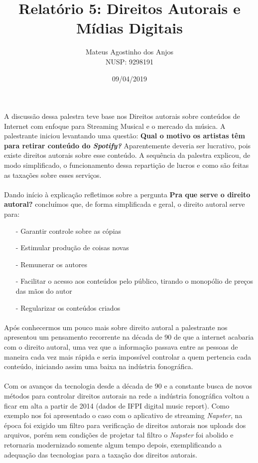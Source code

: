 \documentclass[10pt]{article}
\title{Relatório 5: Direitos Autorais e Mídias Digitais}
\author{Mateus Agostinho dos Anjos\\NUSP: 9298191}
\date{09/04/2019}
\begin{document}
	\maketitle
	\paragraph{}
		A discussão dessa palestra teve base nos Direitos autorais sobre conteúdos 
		de Internet com enfoque para Streaming Musical e o mercado da música.
		A palestrante iniciou levantando uma questão: \textbf{Qual o motivo os artistas 
		têm para retirar conteúdo do \textit{Spotify?}} Aparentemente deveria ser 
		lucrativo, pois existe direitos autorais sobre esse conteúdo. A sequência da 
		palestra explicou, de modo simplificado, o funcionamento dessa repartição de 
		lucros e como são feitas as taxações sobre esses serviços.
	\paragraph{}
		Dando início à explicação refletimos sobre a pergunta \textbf{Pra que serve
		o direito autoral?} concluímos que, de forma simplificada e geral, o direito
		autoral serve para:
		\begin{center}				
			\begin{itemize}
				\item[ - ]
					Garantir controle sobre as cópias
				\item[ - ]
					Estimular produção de coisas novas
				\item[ - ]
					Remunerar os autores
				\item[ - ]
					Facilitar o acesso aos conteúdos pelo público, tirando o monopólio
					de preços das mãos do autor
				\item[ - ]
					Regularizar os conteúdos criados	
			\end{itemize}
		\end{center}
	\paragraph{}
		Após conhecermos um pouco mais sobre direito autoral a palestrante nos
		apresentou um pensamento recorrente na década de 90 de que a internet
		acabaria com o direito autoral, uma vez que a informação passava entre as
		pessoas de maneira cada vez mais rápida e seria impossível controlar a quem 
		pertencia cada conteúdo, iniciando assim uma baixa na indústria fonográfica.
	\paragraph{}
		Com os avanços da tecnologia desde a década de 90 e a constante busca de novos
		métodos para controlar direitos autorais na rede a indústria fonográfica voltou a 
		ficar em alta a partir de 2014 (dados de IFPI digital music report). Como exemplo
		nos foi apresentado o caso com o aplicativo de streaming \textit{Napster}, na
		época foi exigido um filtro para verificação de direitos autorais nos uploads dos
		arquivos, porém sem condições de projetar tal filtro o \textit{Napster} foi
		abolido e retornaria modernizado somente algum tempo depois, exemplificando
		a adequação das tecnologias para a taxação dos direitos autorais.
\end{document}
